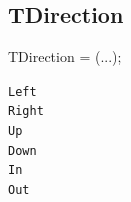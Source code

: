 \documentclass{report}
\begin{document}
\subsection*{TDirection}
\begin{list}{}{
\setlength{\itemindent}{0cm}
\setlength{\listparindent}{0cm}
\setlength{\leftmargin}{\evensidemargin}
\addtolength{\leftmargin}{\tmplength}
\settowidth{\labelsep}{X}
\addtolength{\leftmargin}{\labelsep}
\setlength{\labelwidth}{\tmplength}
}
\begin{flushleft}
\item[\textbf{Declaration}\hfill]
\begin{ttfamily}
TDirection = (...);\end{ttfamily}


\end{flushleft}
\par
\item[\textbf{Description}]
 \item[\textbf{Values}]
\begin{description}
\item[\texttt{Left}]  
\item[\texttt{Right}]  
\item[\texttt{Up}]  
\item[\texttt{Down}]  
\item[\texttt{In}]  
\item[\texttt{Out}]  
\end{description}


\end{list}
\end{document}
